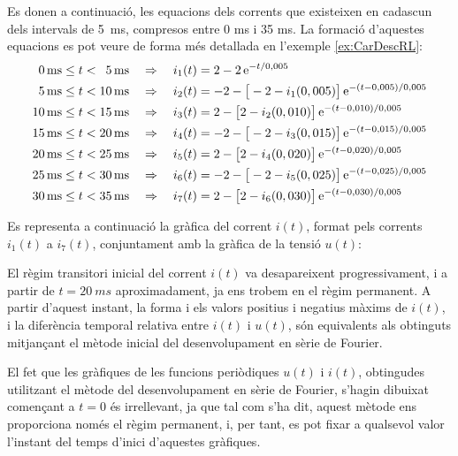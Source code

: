 \begin{exemple}
    Es donen a continuació, les equacions dels corrents que existeixen en cadascun dels intervals de \qty{5}{ms}, compresos entre 0 ms i 35 ms. La formació d'aquestes equacions es pot veure de forma més detallada en l'exemple \vref{ex:CarDescRL}:
    \begin{align*}
      \phantom{0}\qty{0}{ms} \leq t < \phantom{0}\qty{5}{ms}  & \quad\Rightarrow\quad i_1(t) = 2 - 2 \,\mathrm{e}^{-t/0,005} \\
      \phantom{0}\qty{5}{ms} \leq t < \qty{10}{ms} & \quad\Rightarrow\quad i_2(t) = -2 - \big[-2 - i_1(0,005)\big]\, \mathrm{e}^{-(t-0,005)/0,005}  \\
      \qty{10}{ms}\leq t < \qty{15}{ms} & \quad\Rightarrow\quad i_3(t) = 2 - \big[2 - i_2(0,010)\big]\, \mathrm{e}^{-(t-0,010)/0,005} \\
      \qty{15}{ms} \leq t < \qty{20}{ms} & \quad\Rightarrow\quad i_4(t) = -2 - \big[-2 - i_3(0,015)\big]\, \mathrm{e}^{-(t-0,015)/0,005}  \\
      \qty{20}{ms}\leq t < \qty{25}{ms} & \quad\Rightarrow\quad i_5(t) = 2 - \big[2 - i_4(0,020)\big]\, \mathrm{e}^{-(t-0,020)/0,005} \\
      \qty{25}{ms} \leq t < \qty{30}{ms} & \quad\Rightarrow\quad i_6(t) = -2 - \big[-2 - i_5(0,025)\big]\, \mathrm{e}^{-(t-0,025)/0,005}  \\
      \qty{30}{ms}\leq t < \qty{35}{ms} & \quad\Rightarrow\quad i_7(t) = 2 - \big[2 - i_6(0,030)\big]\, \mathrm{e}^{-(t-0,030)/0,005}
    \end{align*}

    Es representa a continuació la gràfica del corrent $i(t)$, format pels corrents $i_1(t)$ a $i_7(t)$, conjuntament amb la gràfica de la tensió $u(t)$:
    \begin{center}
      
    \end{center}

    El règim transitori inicial del corrent $i(t)$ va desapareixent progressivament, i a partir de $t=\qty{20}{ms}$ aproximadament, ja ens trobem en el règim permanent.
    A partir d'aquest instant, la forma i els valors positius i negatius màxims de $i(t)$, i la diferència temporal relativa entre $i(t)$ i $u(t)$, són equivalents als obtinguts mitjançant el mètode inicial del desenvolupament en sèrie de Fourier.

    El fet que les gràfiques de les funcions periòdiques $u(t)$ i  $i(t)$, obtingudes utilitzant el mètode del desenvolupament en sèrie de Fourier, s'hagin dibuixat començant a $t=0$ és irrellevant, ja que tal com s'ha dit,   aquest mètode ens proporciona només el règim permanent, i, per tant, es pot fixar a qualsevol valor l'instant del temps d'inici d'aquestes gràfiques.
\end{exemple}
